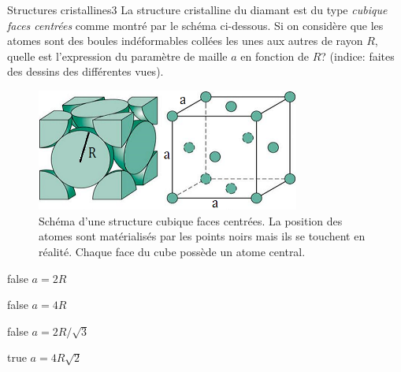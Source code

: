 \documentclass[11pt]{article}
\begin{document}
        \begin{question}{31}{Structures cristallines}{3}{}
            La structure cristalline du diamant est du type \emph{cubique faces centrées} comme montré par le schéma ci-dessous. Si on considère que les atomes sont des boules indéformables collées les unes aux autres de rayon $R$, quelle est l'expression du paramètre de maille $a$ en fonction de $R$? (indice: faites des dessins des différentes vues).
            \begin{figure}
                \centering
                \includegraphics[height = 4cm]{Antoine/Figures_Antoine/FCC.png}
                \caption{Schéma d'une structure cubique faces centrées. La position des atomes sont matérialisés par les points noirs mais ils se touchent en réalité.  Chaque face du cube possède un atome central.}
            \end{figure}
        \end{question}
        \begin{reponses} 
            \item[false] $a = 2R$
            \item[false] $a = 4R$
            \item[false] $a = 2R/\sqrt{3}$
    	    \item[true] $a = 4R\sqrt{2}$
        \end{reponses}
        
\end{document}
